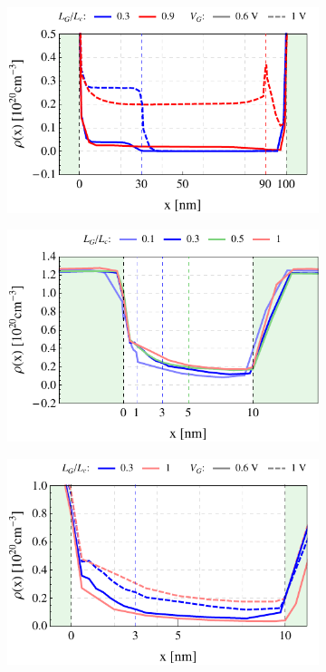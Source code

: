 \documentclass[11pt, a4paper]{article}
\begin{document}
\begin{figure}
\begin{subfigure}{0.245\linewidth}
		\caption{}\label{fig:3:2b}
	\end{subfigure}
	\begin{subfigure}{0.245\linewidth}
		\centering
		\includegraphics[width=1\linewidth]{ndxPG100vg0610}
		\caption{}\label{fig:3:4b}
	\end{subfigure}
	\begin{subfigure}{0.245\linewidth}
		\centering
		\includegraphics[width=1\linewidth]{ndxPG10}
		\caption{}\label{fig:3:3b}
	\end{subfigure}
	\begin{subfigure}{0.245\linewidth}
		\centering
		\includegraphics[width=1\linewidth]{ndxPG10vg0610_new}

\end{subfigure}
\end{figure}
\end{document}
